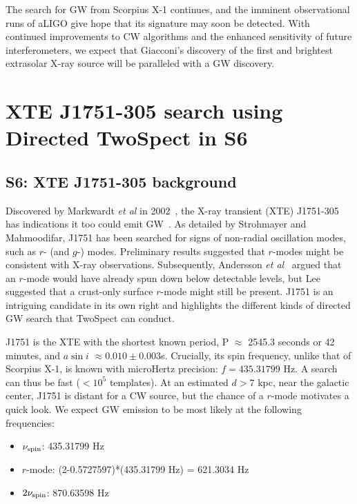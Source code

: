 The search for GW from Scorpius X-1 continues, and the imminent observational runs of aLIGO give hope that its signature may soon be detected.
With continued improvements to CW algorithms and the enhanced sensitivity of future interferometers, we expect that Giacconi's discovery of the first and brightest extrasolar X-ray source will be paralleled with a GW discovery.

\section{XTE J1751-305 search using Directed TwoSpect in S6}

\subsection{S6: XTE J1751-305 background}

Discovered by Markwardt \textit{et al} in 2002~\cite{Markwardt2002}, the X-ray transient (XTE) J1751-305 has indications it too could emit GW~\cite{Strohmayer2014}.
As detailed by Strohmayer and Mahmoodifar, J1751 has been searched for signs of non-radial oscillation modes, such as $r$- (and $g$-) modes.
Preliminary results suggested that $r$-modes might be consistent with X-ray observations.
Subsequently, Andersson \textit{et al}~\cite{Andersson2014} argued that an $r$-mode would have already spun down below detectable levels, but Lee~\cite{Lee2014} suggested that a crust-only surface $r$-mode might still be present. 
 J1751 is an intriguing candidate in its own right and highlights the different kinds of directed GW search that TwoSpect can conduct.

J1751 is the XTE with the shortest known period,
P $\approx$$ $ 2545.3 seconds or 42 minutes, and $a \sin i$ $\approx0.010\pm0.003$s.
Crucially, its spin frequency, unlike that of Scorpius X-1, is known with microHertz precision: $f = 435.31799$ Hz.
A search can thus be fast ($< 10^5$ templates).
At an estimated $d > 7$ kpc, near the galactic center, J1751 is distant for a CW source, but the chance of a $r$-mode motivates a quick look.
We expect GW emission to be most likely at the following frequencies:

\begin{itemize}
\item $\nu_\textup{spin}$: 435.31799 Hz
\item $r$-mode: (2-0.5727597)*(435.31799 Hz) = 621.3034 Hz
\item $2\nu_\textup{spin}$: 870.63598 Hz
\end{itemize}

